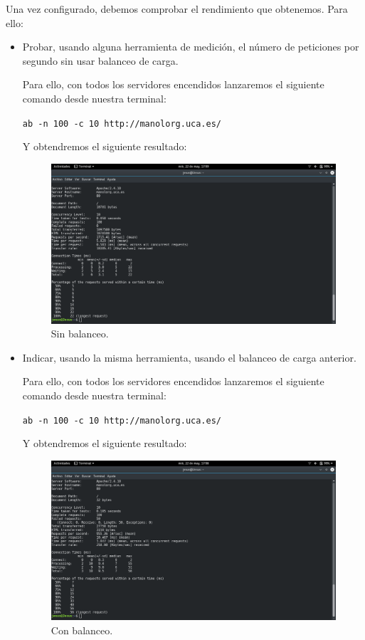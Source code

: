 \documentclass[12pt,letterpaper]{article}
\begin{document}
Una vez configurado, debemos comprobar el rendimiento que obtenemos. Para ello:
\begin{itemize}
	\item Probar, usando alguna herramienta de medición, el número de peticiones por segundo sin usar balanceo de carga.
	
	Para ello, con todos los servidores encendidos lanzaremos el siguiente comando desde nuestra terminal:
	\begin{center}
		\texttt{ab -n 100 -c 10 http://manolorg.uca.es/}
	\end{center}

	Y obtendremos el siguiente resultado:
	\begin{figure}[h]
		\centering
		\includegraphics[scale=0.34]{SinBalanceo.png}
		\caption{Sin balanceo.}
		\label{Sin balanceo}
	\end{figure}

	\item Indicar, usando la misma herramienta, usando el balanceo de carga anterior.
	
	Para ello, con todos los servidores encendidos lanzaremos el siguiente comando desde nuestra terminal:
	\begin{center}
		\texttt{ab -n 100 -c 10 http://manolorg.uca.es/}
	\end{center}
	\newpage
	Y obtendremos el siguiente resultado:
	\begin{figure}[h]
		\centering
		\includegraphics[scale=0.34]{ConBalanceo.png}
		\caption{Con balanceo.}
		\label{Con balanceo}
	\end{figure}
\end{itemize}
\end{document}
